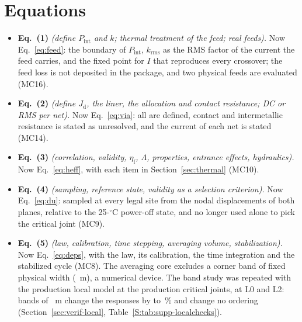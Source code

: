 \documentclass[10pt]{article}
\begin{document}
\section*{Equations}
\begin{itemize}
\item \textbf{Eq.~(1)} \emph{(define $P_{\mathrm{int}}$ and $k$; thermal treatment of the feed; real
feeds).} Now Eq.~\eqref{eq:feed}: the boundary of $P_{\mathrm{int}}$, $k_{\mathrm{rms}}$ as the RMS
factor of the current the feed carries, and the fixed point for $I$ that reproduces every crossover;
the feed loss is not deposited in the package, and two physical feeds are evaluated (MC16).
\item \textbf{Eq.~(2)} \emph{(define $J_{\mathrm{d}}$, the liner, the allocation and contact
resistance; DC or RMS per net).} Now Eq.~\eqref{eq:via}: all are defined, contact and intermetallic
resistance is stated as unresolved, and the current of each net is stated (MC14).
\item \textbf{Eq.~(3)} \emph{(correlation, validity, $\eta_{\mathrm{f}}$, $\Lambda$, properties,
entrance effects, hydraulics).} Now Eq.~\eqref{eq:heff}, with each item in
Section~\ref{sec:thermal} (MC10).
\item \textbf{Eq.~(4)} \emph{(sampling, reference state, validity as a selection criterion).} Now
Eq.~\eqref{eq:du}: sampled at every legal site from the nodal displacements of both planes, relative to
the 25-$^\circ$C power-off state, and no longer used alone to pick the critical joint (MC9).
\item \textbf{Eq.~(5)} \emph{(law, calibration, time stepping, averaging volume, stabilization).} Now
Eq.~\eqref{eq:deps}, with the law, its calibration, the time integration and the stabilized cycle
(MC8). The averaging core excludes a corner band of fixed physical width (\MthBandProdUm~\textmu m), a
numerical device. The band study was repeated with the production local model at the
\MthBandNjointsWord{} production critical joints, at L0 and L2: bands of \MthBandUm~\textmu m change the
responses by \MthBandLo{} to \MthBandHi\,\% and change no ordering (Section~\ref{sec:verif-local},
Table~\ref{S:tab:supp-localchecks}).
\end{itemize}
\end{document}
